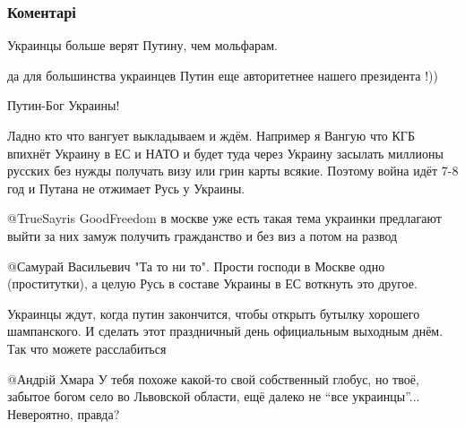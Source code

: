  
 
 
 
 
\subsubsection{Коментарі}
\label{sec:06_12_2021.youtube.medvedeva_olesja.1.molfary.cmt}

\begin{itemize} %
Украинцы больше верят Путину, чем мольфарам.

\begin{itemize} %
да для большинства украинцев Путин еще авторитетнее нашего президента !))

Путин-Бог Украины!


Ладно кто что вангует выкладываем и ждём. Например я Вангую что КГБ впихнёт
Украину в ЕС и НАТО и будет туда через Украину засылать миллионы русских без
нужды получать визу или грин карты всякие. Поэтому война идёт 7-8 год и Путана
не отжимает Русь у Украины.


 @TrueSayris GoodFreedom  в москве уже есть такая тема украинки предлагают
выйти за них замуж получить гражданство и без виз а потом на развод


@Самурай Васильевич  "Та то ни то". Прости господи в Москве одно
(проститутки), а целую Русь в составе Украины в ЕС воткнуть это другое.


Украинцы ждут, когда путин закончится, чтобы открыть бутылку хорошего
шампанского. И сделать этот праздничный день официальным выходным днём. Так что
можете расслабиться


@Андрiй Хмара  У тебя похоже какой-то свой собственный глобус, но твоё,
забытое богом село во Львовской области, ещё далеко не \enquote{все украинцы}...
Невероятно, правда?



\end{itemize}
\end{itemize}
